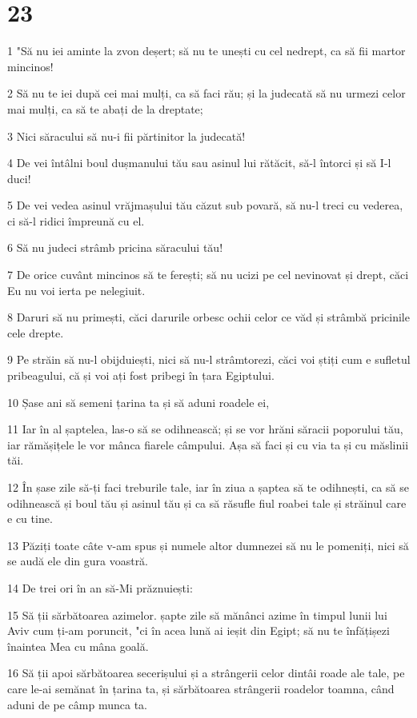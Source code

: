 \chapter{23}

\par 1 "Să nu iei aminte la zvon deșert; să nu te unești cu cel nedrept, ca să fii martor mincinos!
\par 2 Să nu te iei după cei mai mulți, ca să faci rău; și la judecată să nu urmezi celor mai mulți, ca să te abați de la dreptate;
\par 3 Nici săracului să nu-i fii părtinitor la judecată!
\par 4 De vei întâlni boul dușmanului tău sau asinul lui rătăcit, să-l întorci și să I-l duci!
\par 5 De vei vedea asinul vrăjmașului tău căzut sub povară, să nu-l treci cu vederea, ci să-l ridici împreună cu el.
\par 6 Să nu judeci strâmb pricina săracului tău!
\par 7 De orice cuvânt mincinos să te ferești; să nu ucizi pe cel nevinovat și drept, căci Eu nu voi ierta pe nelegiuit.
\par 8 Daruri să nu primești, căci darurile orbesc ochii celor ce văd și strâmbă pricinile cele drepte.
\par 9 Pe străin să nu-l obijduiești, nici să nu-l strâmtorezi, căci voi știți cum e sufletul pribeagului, că și voi ați fost pribegi în țara Egiptului.
\par 10 Șase ani să semeni țarina ta și să aduni roadele ei,
\par 11 Iar în al șaptelea, las-o să se odihnească; și se vor hrăni săracii poporului tău, iar rămășițele le vor mânca fiarele câmpului. Așa să faci și cu via ta și cu măslinii tăi.
\par 12 În șase zile să-ți faci treburile tale, iar în ziua a șaptea să te odihnești, ca să se odihnească și boul tău și asinul tău și ca să răsufle fiul roabei tale și străinul care e cu tine.
\par 13 Păziți toate câte v-am spus și numele altor dumnezei să nu le pomeniți, nici să se audă ele din gura voastră.
\par 14 De trei ori în an să-Mi prăznuiești:
\par 15 Să ții sărbătoarea azimelor. șapte zile să mănânci azime în timpul lunii lui Aviv cum ți-am poruncit, "ci în acea lună ai ieșit din Egipt; să nu te înfățișezi înaintea Mea cu mâna goală.
\par 16 Să ții apoi sărbătoarea secerișului și a strângerii celor dintâi roade ale tale, pe care le-ai semănat în țarina ta, și sărbătoarea strângerii roadelor toamna, când aduni de pe câmp munca ta.
